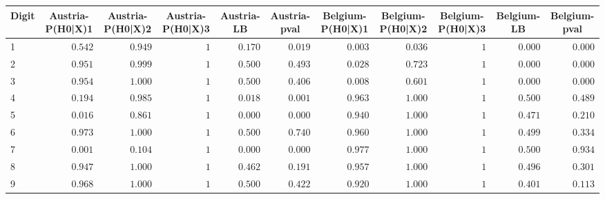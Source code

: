 \begin{table}[!tbp]
\begin{center}
\begin{tabular}{lrrrrrrrrrr}
\hline\hline
\multicolumn{1}{l}{Digit}&\multicolumn{1}{c}{Austria-P(H0|X)1}&\multicolumn{1}{c}{Austria-P(H0|X)2}&\multicolumn{1}{c}{Austria-P(H0|X)3}&\multicolumn{1}{c}{Austria-LB}&\multicolumn{1}{c}{Austria-pval}&\multicolumn{1}{c}{Belgium-P(H0|X)1}&\multicolumn{1}{c}{Belgium-P(H0|X)2}&\multicolumn{1}{c}{Belgium-P(H0|X)3}&\multicolumn{1}{c}{Belgium-LB}&\multicolumn{1}{c}{Belgium-pval}\tabularnewline
\hline
1&$0.542$&$0.949$&$1$&$0.170$&$0.019$&$0.003$&$0.036$&$1$&$0.000$&$0.000$\tabularnewline
2&$0.951$&$0.999$&$1$&$0.500$&$0.493$&$0.028$&$0.723$&$1$&$0.000$&$0.000$\tabularnewline
3&$0.954$&$1.000$&$1$&$0.500$&$0.406$&$0.008$&$0.601$&$1$&$0.000$&$0.000$\tabularnewline
4&$0.194$&$0.985$&$1$&$0.018$&$0.001$&$0.963$&$1.000$&$1$&$0.500$&$0.489$\tabularnewline
5&$0.016$&$0.861$&$1$&$0.000$&$0.000$&$0.940$&$1.000$&$1$&$0.471$&$0.210$\tabularnewline
6&$0.973$&$1.000$&$1$&$0.500$&$0.740$&$0.960$&$1.000$&$1$&$0.499$&$0.334$\tabularnewline
7&$0.001$&$0.104$&$1$&$0.000$&$0.000$&$0.977$&$1.000$&$1$&$0.500$&$0.934$\tabularnewline
8&$0.947$&$1.000$&$1$&$0.462$&$0.191$&$0.957$&$1.000$&$1$&$0.496$&$0.301$\tabularnewline
9&$0.968$&$1.000$&$1$&$0.500$&$0.422$&$0.920$&$1.000$&$1$&$0.401$&$0.113$\tabularnewline
\hline
\end{tabular}\end{center}
\end{table}
